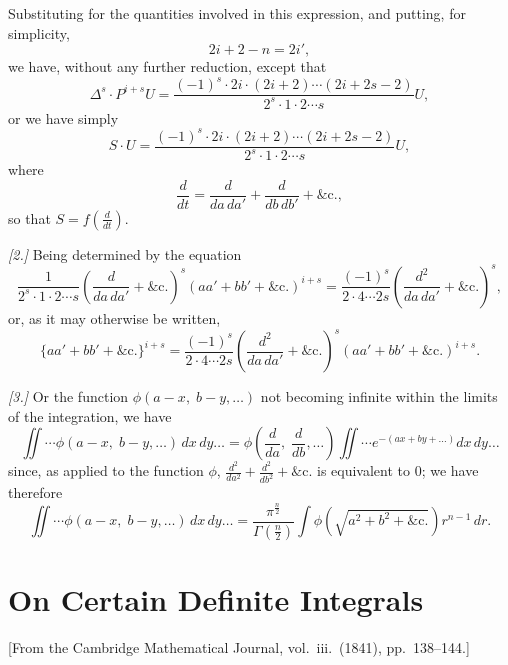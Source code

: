\documentclass[11pt,a4paper]{book}
\theoremstyle{plain}
\theoremstyle{definition}
\theoremstyle{remark}
\begin{document}
Substituting for the quantities involved in this expression, and putting, for simplicity,
\[
2i + 2 - n = 2i',
\]
we have, without any further reduction, except that
\[
\Delta^s \cdot P^{i+s} U = \frac{(-1)^s \cdot 2i \cdot (2i+2) \cdots (2i+2s-2)}{2^s \cdot 1 \cdot 2 \cdots s} U,
\]
or we have simply
\[
S \cdot U = \frac{(-1)^s \cdot 2i \cdot (2i+2) \cdots (2i+2s-2)}{2^s \cdot 1 \cdot 2 \cdots s} U,
\]
where
\[
\frac{d}{dt} = \frac{d}{da\, da'} + \frac{d}{db\, db'} + \&\mathrm{c.},
\]
so that $S = f\left(\frac{d}{dt}\right)$.

\textit{[2.]} Being determined by the equation
\[
\frac{1}{2^s \cdot 1 \cdot 2 \cdots s} \left(\frac{d}{da\, da'} + \&\mathrm{c.}\right)^s (aa' + bb' + \&\mathrm{c.})^{i+s}
= \frac{(-1)^s}{2 \cdot 4 \cdots 2s} \left(\frac{d^2}{da\, da'} + \&\mathrm{c.}\right)^s,
\]
or, as it may otherwise be written,
\[
\{aa' + bb' + \&\mathrm{c.}\}^{i+s}
= \frac{(-1)^s}{2 \cdot 4 \cdots 2s} \left(\frac{d^2}{da\, da'} + \&\mathrm{c.}\right)^s (aa' + bb' + \&\mathrm{c.})^{i+s}.
\]

\textit{[3.]} Or the function $\phi(a-x,\; b-y,\ldots)$ not becoming infinite within the limits of the integration, we have
\[
\iint \cdots \phi(a-x,\; b-y,\ldots)\, dx\, dy \ldots
= \phi\left(\frac{d}{da},\; \frac{d}{db},\ldots\right) \iint \cdots e^{-(ax + by + \ldots)} dx\, dy \ldots
\]
since, as applied to the function $\phi$, $\frac{d^2}{da^2} + \frac{d^2}{db^2} + \&\mathrm{c.}$ is equivalent to $0$; we have therefore
\[
\iint \cdots \phi(a-x,\; b-y,\ldots)\, dx\, dy \ldots
= \frac{\pi^{\frac{n}{2}}}{\Gamma\left(\frac{n}{2}\right)} \int \phi\left(\sqrt{a^2 + b^2 + \&\mathrm{c.}}\right) r^{n-1}\, dr.
\]

\cleardoublepage

\chapter{On Certain Definite Integrals}
\label{chap:paper3}

\begin{center}
\small[From the Cambridge Mathematical Journal, vol.~iii.\ (1841), pp.~138--144.]
\end{center}

\section*{}
\end{document}
